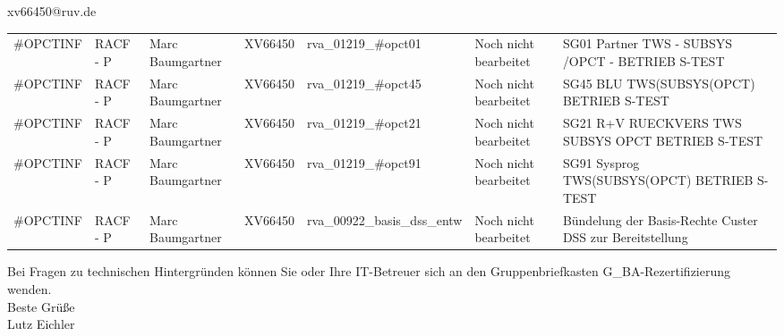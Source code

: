 \documentclass[a4paper,landscape,12pt]{letter}
\begin{document}
\begin{letter}{xv66450@ruv.de\hfill \break}
\begin{tiny}
\begin{longtable}{|p{35mm}|p{15mm}|p{25mm}|p{10mm}|p{40mm}|p{50mm}|p{50mm}|}
\#OPCTINF & RACF - P & Marc Baumgartner & XV66450 & rva\_01219\_\#opct01 & Noch nicht bearbeitet & SG01 Partner TWS - SUBSYS /OPCT - BETRIEB S-TEST \\
\#OPCTINF & RACF - P & Marc Baumgartner & XV66450 & rva\_01219\_\#opct45 & Noch nicht bearbeitet & SG45 BLU TWS(SUBSYS(OPCT) BETRIEB S-TEST \\
\#OPCTINF & RACF - P & Marc Baumgartner & XV66450 & rva\_01219\_\#opct21 & Noch nicht bearbeitet & SG21 R+V RUECKVERS TWS SUBSYS OPCT BETRIEB S-TEST \\
\#OPCTINF & RACF - P & Marc Baumgartner & XV66450 & rva\_01219\_\#opct91 & Noch nicht bearbeitet & SG91 Sysprog TWS(SUBSYS(OPCT) BETRIEB S-TEST \\
\#OPCTINF & RACF - P & Marc Baumgartner & XV66450 & rva\_00922\_basis\_dss\_entw & Noch nicht bearbeitet & Bündelung der Basis-Rechte Custer DSS zur Bereitstellung \\

\hline
		\end{longtable}
		\end{tiny}
	
\begin{minipage}{\textwidth}
			Bei Fragen zu technischen Hintergründen können Sie 
			oder Ihre IT-Betreuer sich an den Gruppenbriefkasten 
			G\_BA-Rezertifizierung
			wenden.\\
			\linebreak
			Beste Grüße\\
			Lutz Eichler
	\end{minipage}
	\end{letter}
	
\end{document}
